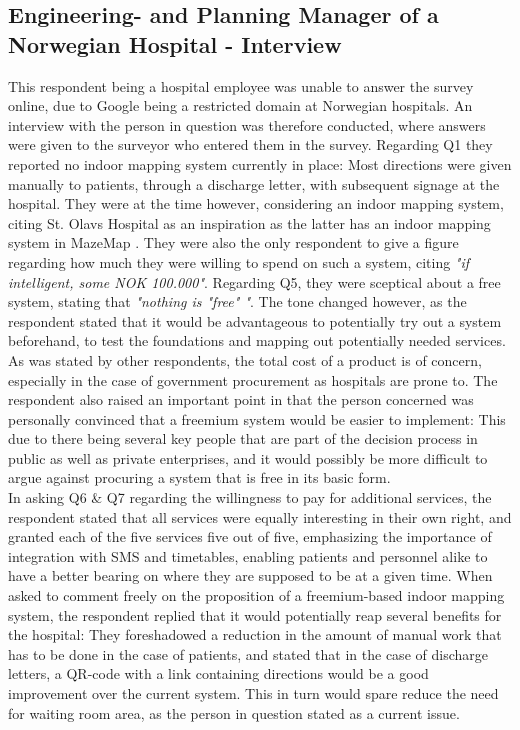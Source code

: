 \subsection{Engineering- and Planning Manager of a Norwegian Hospital - Interview}
This respondent being a hospital employee was unable to answer the survey online, due to Google being a restricted domain at Norwegian hospitals. An interview with the person in question was therefore conducted, where answers were given to the surveyor who entered them in the survey. Regarding Q1 they reported no indoor mapping system currently in place: Most directions were given manually to patients, through a discharge letter, with subsequent signage at the hospital. They were at the time however, considering an indoor mapping system, citing St. Olavs Hospital as an inspiration as the latter has an indoor mapping system in MazeMap \cite{st.olavshospital2013}. They were also the only respondent to give a figure regarding how much they were willing to spend on such a system, citing \textit{"if intelligent, some NOK 100.000"}. Regarding Q5, they were sceptical about a free system, stating that \textit{"nothing is "free" "}. The tone changed however, as the respondent stated that it would be advantageous to potentially try out a system beforehand, to test the foundations and mapping out potentially needed services. As was stated by other respondents, the total cost of a product is of concern, especially in the case of government procurement as hospitals are prone to. The respondent also raised an important point in that the person concerned was personally convinced that a freemium system would be easier to implement: This due to there being several key people that are part of the decision process in public as well as private enterprises, and it would possibly be more difficult to argue against procuring a system that is free in its basic form. 
\newline
\\
In asking Q6 \& Q7 regarding the willingness to pay for additional services, the respondent stated that all services were equally interesting in their own right, and granted each of the five services five out of five, emphasizing the importance of integration with SMS and timetables, enabling patients and personnel alike to have a better bearing on where they are supposed to be at a given time. When asked to comment freely on the proposition of a freemium-based indoor mapping system, the respondent replied that it would potentially reap several benefits for the hospital: They foreshadowed a reduction in the amount of manual work that has to be done in the case of patients, and stated that in the case of discharge letters, a QR-code with a link containing directions would be a good improvement over the current system. This in turn would spare reduce the need for waiting room area, as the person in question stated as a current issue.

